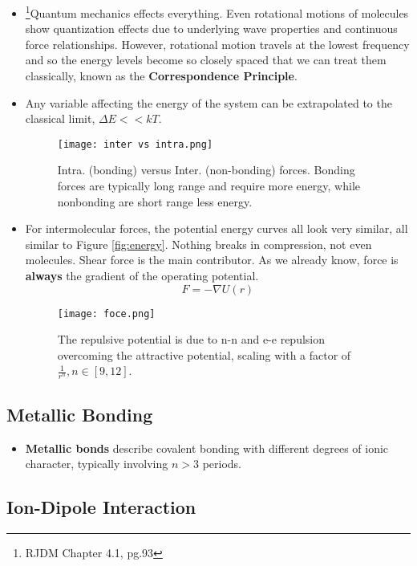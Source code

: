 \documentclass[12pt, letterpaper, twoside]{article}
\begin{document}
\begin{itemize}
    \item \footnote{RJDM Chapter 4.1, pg.93}Quantum mechanics effects everything. Even rotational motions of molecules show quantization effects due to underlying wave properties and continuous force relationships. However, rotational motion travels at the lowest frequency and so the energy levels become so closely spaced that we can treat them classically, known as the \textbf{Correspondence Principle}.
    \item Any variable affecting the energy of the system can be extrapolated to the classical limit, $\Delta E << kT$.
    \begin{figure}[!ht]
        \centering
        \texttt{[image: inter vs intra.png]}
        \caption{Intra. (bonding) versus Inter. (non-bonding) forces. Bonding forces are typically long range and require more energy, while nonbonding are short range less energy.}
        \label{fig:intervsintra}
    \end{figure}
    \item For intermolecular forces, the potential energy curves all look very similar, all similar to Figure \ref{fig:energy}. Nothing breaks in compression, not even molecules. Shear force is the main contributor. As we already know, force is \textbf{always} the gradient of the operating potential.
    \begin{equation*}
        F = -\nabla U(r) 
    \end{equation*}
    \begin{figure}[!ht]
        \centering
        \texttt{[image: foce.png]}
        \caption{The repulsive potential is due to n-n and e-e repulsion overcoming the attractive potential, scaling with a factor of $\frac{1}{r^n}, n \in [9,12]$.}
        \label{fig:my_label}
    \end{figure}
\end{itemize}

\subsection{Metallic Bonding}

\begin{itemize}
    \item \textbf{Metallic bonds} describe covalent bonding with different degrees of ionic character, typically involving $n > 3$ periods.
\end{itemize}
\subsection{Ion-Dipole Interaction}
\end{document}
